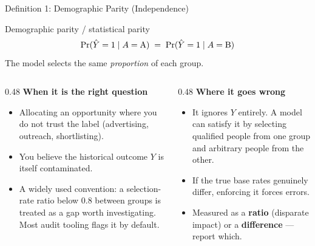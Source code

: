 
\begin{frame}{Definition 1: Demographic Parity (Independence)}

    \begin{block}{Demographic parity / statistical parity}
        \[
            \Pr(\hat{Y} = 1 \mid A = \text{A}) \;=\; \Pr(\hat{Y} = 1 \mid A = \text{B})
        \]
        The model selects the same \emph{proportion} of each group.
    \end{block}

    \vspace{0.6em}

    \begin{columns}[T]
        \begin{column}{0.48\textwidth}
            \textbf{When it is the right question}
            \begin{itemize}\small
                \setlength\itemsep{0.3em}
                \item Allocating an opportunity where you do not trust the label
                      (advertising, outreach, shortlisting).
                \item You believe the historical outcome $Y$ is itself contaminated.
                \item A widely used convention: a selection-rate ratio below $0.8$ between groups
                      is treated as a gap worth investigating. Most audit tooling flags it by
                      default.
            \end{itemize}
        \end{column}
        \begin{column}{0.48\textwidth}
            \textbf{Where it goes wrong}
            \begin{itemize}\small
                \setlength\itemsep{0.3em}
                \item It ignores $Y$ entirely. A model can satisfy it by selecting qualified people
                      from one group and arbitrary people from the other.
                \item If the true base rates genuinely differ, enforcing it forces errors.
                \item Measured as a \textbf{ratio} (disparate impact) or a \textbf{difference}
                      --- report which.
            \end{itemize}
        \end{column}
    \end{columns}
\end{frame}
